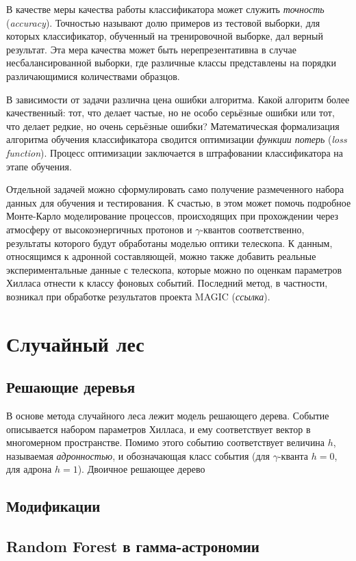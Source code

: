 \documentclass[magd,floatypics,numeref]{msudipl} %
\begin{document}
В качестве меры качества работы классификатора может служить \textit{точность} (\textit{accuracy}). Точностью называют долю примеров из тестовой выборки, для которых классификатор, обученный на тренировочной выборке, дал верный результат.  Эта мера качества может быть нерепрезентативна в случае несбалансированной выборки, где различные классы представлены на порядки различающимися количествами образцов. 

В зависимости от задачи различна цена ошибки алгоритма. Какой алгоритм более качественный: тот, что делает частые, но не особо серьёзные ошибки или тот, что делает редкие, но очень серьёзные ошибки? Математическая формализация алгоритма обучения классификатора сводится оптимизации \textit{функции потерь} (\textit{loss function}). Процесс оптимизации заключается в штрафовании классификатора на этапе обучения.

Отдельной задачей можно сформулировать само получение размеченного набора данных для обучения и тестирования. К счастью, в этом может помочь подробное Монте-Карло моделирование процессов, происходящих при прохождении через атмосферу от высокоэнергичных протонов и $\gamma$-квантов соответственно, результаты которого будут обработаны моделью оптики телескопа. К данным, относящимся к адронной составляющей, можно также добавить реальные экспериментальные данные с телескопа, которые можно по оценкам параметров Хилласа отнести к классу фоновых событий. Последний метод, в частности, возникал при обработке результатов проекта MAGIC (\textit{ссылка}).

\section{Случайный лес}
\subsection{Решающие деревья}
В основе метода случайного леса лежит модель решающего дерева. Событие описывается набором параметров Хилласа, и ему соответствует вектор в многомерном пространстве. Помимо этого событию соответствует величина $h$, называемая \textit{адронностью}, и обозначающая класс события (для $\gamma$-кванта $h=0$, для адрона $h = 1$). Двоичное решающее дерево 
\subsection{Модификации}
\subsection{Random Forest в гамма-астрономии}
\end{document}
